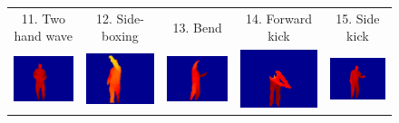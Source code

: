 \documentclass[final,3p,times,twocolumn]{elsarticle}
\begin{document}
\begin{figure}[ht]
{\begin{tabular}{ccccc}
			11. Two hand wave &          12. Side-boxing &         13. Bend &          14. Forward kick &          15. Side kick\\
			
			\includegraphics[width=0.4\columnwidth]{Figures/MSRAction3D_jogging.pdf} &		
			\includegraphics[width=0.4\columnwidth]{Figures/MSRAction3D_tennisswing.pdf} &          \includegraphics[width=0.4\columnwidth]{Figures/MSRAction3D_tennisserve.pdf} &          \includegraphics[width=0.4\columnwidth]{Figures/MSRAction3D_golfswing.pdf} &          \includegraphics[width=0.4\columnwidth]{Figures/MSRAction3D_pickupandthrow.pdf} \\
			

\end{tabular}}
\end{figure}
\end{document}
